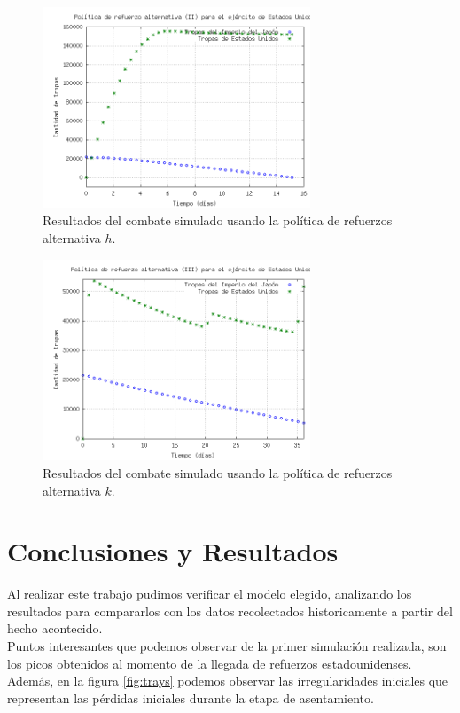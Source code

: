 \documentclass{sig-alternate}
\begin{document}
\begin{figure}[h]
\begin{center}
\includegraphics[width=8cm]{reinforce3.png}
\caption{\label{fig:reinforce3}Resultados del combate simulado usando la política de refuerzos alternativa $h$.}
\end{center}
\end{figure}


\begin{figure}[h]
\begin{center}
\includegraphics[clip, width=8cm]{reinforce4.png}
\caption{\label{fig:reinforce4}Resultados del combate simulado usando la política de refuerzos alternativa $k$.}
\end{center}
\end{figure}


\section{Conclusiones y Resultados}
\label{sec:conclusiones}

Al realizar este trabajo pudimos verificar el modelo elegido, analizando los resultados para compararlos con los datos recolectados historicamente
a partir del hecho acontecido. \\
Puntos interesantes que podemos observar de la primer simulación realizada, son los picos obtenidos al momento de la llegada de refuerzos
estadounidenses. Además, en la figura \ref{fig:trays} podemos observar las irregularidades iniciales que representan las pérdidas iniciales durante la etapa de asentamiento.\\
\end{document}
